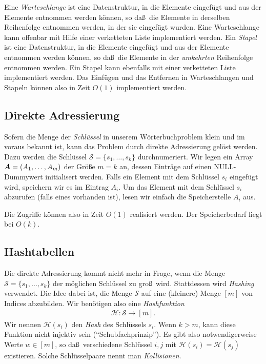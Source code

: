\documentclass[10pt,reqno]{amsart}
\numberwithin{equation}{section}
\newcommand\cH{\mathcal H}
\newcommand\cS{\mathcal S}
\newcommand\vA{\vec A}
\def\vec#1{\mathchoice{\mbox{\boldmath$\displaystyle#1$}}
{\mbox{\boldmath$\textstyle#1$}}
{\mbox{\boldmath$\scriptstyle#1$}}
{\mbox{\boldmath$\scriptscriptstyle#1$}}}
\begin{document}
Eine {\em Warteschlange} ist eine Datenstruktur, in die Elemente eingef\"ugt und aus der Elemente entnommen werden k\"onnen, so da\ss\ die Elemente in derselben Reihenfolge entnommen werden, in der sie eingef\"ugt wurden.
Eine Warteschlange kann offenbar mit Hilfe einer verketteten Liste implementiert werden.
Ein {\em Stapel} ist eine Datenstruktur, in die Elemente eingef\"ugt und aus der Elemente entnommen werden k\"onnen, so da\ss\ die Elemente in der {\em umkehrten} Reihenfolge entnommen werden.
Ein Stapel kann ebenfalls mit einer verketteten Liste implementiert werden.
Das Einf\"ugen und das Entfernen in Warteschlangen und Stapeln k\"onnen also in Zeit $O(1)$ implementiert werden.

\subsection{Direkte Adressierung}\label{sec_direct}
Sofern die Menge der {\em Schl\"ussel} in unserem W\"orterbuchproblem klein und im voraus bekannt ist, kann das Problem durch direkte Adressierung gel\"ost werden.
Dazu werden die Schl\"ussel $\cS=\{s_1,\ldots,s_k\}$ durchnumeriert.
Wir legen ein Array $\vA=(A_1,\ldots,A_m)$ der Gr\"o\ss e $m=k$ an, dessen Eintr\"age auf einen NULL-Dummywert initialisert werden.
Falls ein Element mit dem Schl\"ussel $s_i$ eingef\"ugt wird, speichern wir es im Eintrag $A_i$.
Um das Element mit dem Schl\"ussel $s_i$ abzurufen (falls eines vorhanden ist), lesen wir einfach die Speicherstelle $A_i$ aus.

Die Zugriffe k\"onnen also in Zeit $O(1)$ realisiert werden.
Der Speicherbedarf liegt bei $O(k)$.

\subsection{Hashtabellen}\label{sec_hashtable}
Die direkte Adressierung kommt nicht mehr in Frage, wenn die Menge $\cS=\{s_1,\ldots,s_k\}$ der m\"oglichen Schl\"ussel zu gro\ss\ wird.
Stattdessen wird {\em Hashing} verwendet.
Die Idee dabei ist, die Menge $\cS$ auf eine (kleinere) Menge $[m]$ von Indices abzubilden.
Wir ben\"otigen also eine {\em Hashfunktion}
\begin{align*}
	\cH:\cS\to[m].
\end{align*}
Wir nennen $\cH(s_i)$ den {\em Hash} des Schl\"ussels $s_i$.
Wenn $k>m$, kann diese Funktion nicht injektiv sein (``Schubfachprinzip'').
Es gibt also notwendigerweise Werte $w\in[m]$, so da\ss\ verschiedene Schl\"ussel $i,j$ mit $\cH(s_i)=\cH(s_j)$ existieren.
Solche Schl\"usselpaare nennt man {\em Kollisionen}.
\end{document}
